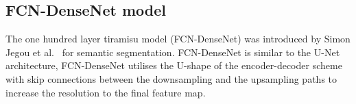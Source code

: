 \subsection{FCN-DenseNet model}
The one hundred layer tiramisu model (FCN-DenseNet) was introduced by Simon Jegou et al.~\cite{Jegou} for semantic segmentation.
FCN-DenseNet is similar to the U-Net architecture, FCN-DenseNet utilises the U-shape of the encoder-decoder scheme with skip connections between the downsampling and the upsampling paths to increase the resolution to the final feature map.

